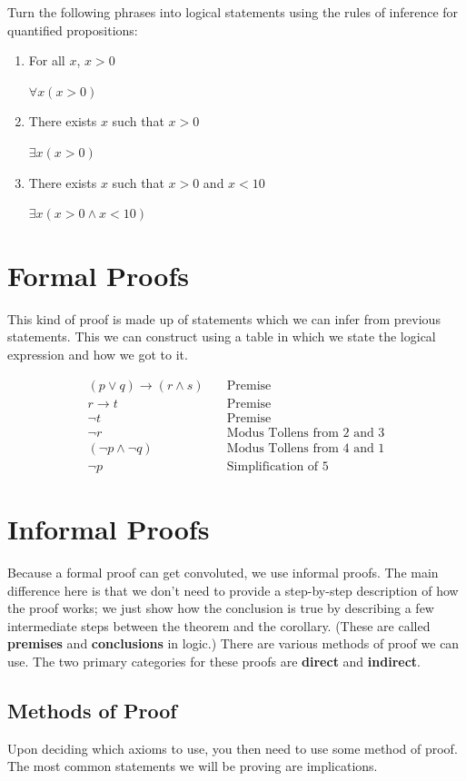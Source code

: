 \documentclass[11pt]{article}
\begin{document}
Turn the following phrases into logical statements using the rules of inference for quantified propositions:
\begin{enumerate}
\item For all \(x\), \(x > 0\)

\(\forall x (x > 0)\)
\item There exists \(x\) such that \(x > 0\)

\(\exists x (x > 0)\)
\item There exists \(x\) such that \(x > 0\) and \(x < 10\)

\(\exists x (x > 0 \land x < 10)\)
\end{enumerate}

\section{Formal Proofs}
\label{sec:org570b4e6}
This kind of proof is made up of statements which we can infer from previous statements. This we can construct using a table in which we state the logical expression and how we got to it.

\begin{align}
(p \lor q) \to (r \land s) & \quad \text{Premise} \\
r \to t & \quad \text{Premise} \\
\neg t & \quad \text{Premise} \\
\neg r & \quad \text{Modus Tollens from 2 and 3} \\
(\neg p \land \neg q) & \quad \text{Modus Tollens from 4 and 1} \\
\neg p & \quad \text{Simplification of 5}
\end{align}

\section{Informal Proofs}
\label{sec:orgf3b7432}
Because a formal proof can get convoluted, we use informal proofs. The main difference here is that we don't need to provide a step-by-step description of how the proof works; we just show how the conclusion is true by describing a few intermediate steps between the theorem and the corollary. (These are called \textbf{premises} and \textbf{conclusions} in logic.)
There are various methods of proof we can use. The two primary categories for these proofs are \textbf{direct} and \textbf{indirect}.

\subsection{Methods of Proof}
\label{sec:org05f992f}
Upon deciding which axioms to use, you then need to use some method of proof. The most common statements we will be proving are implications.
\end{document}
